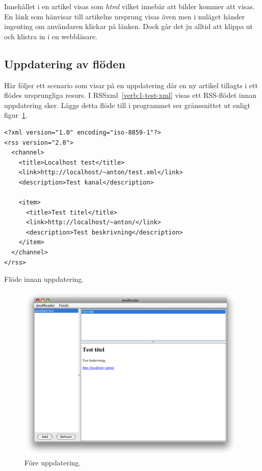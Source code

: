 \documentclass[titlepage, twoside, a4paper, 12pt]{article}
\begin{document}
Innehållet i en artikel visas som \textit{html} vilket innebär att
bilder kommer att visas. En länk som hänvisar till artikelns ursprung
visas även men i nuläget händer ingenting om användaren klickar på
länken. Dock går det ju alltid att klippa ut och klistra in i en
webbläsare.

\subsection{Uppdatering av flöden}
Här följer ett scenario som visar på en uppdatering där en ny artikel
tillagts i ett flödes ursprungliga resurs. I
RSSxml~\ref{verb:1-test-xml} visas ett RSS-flödet innan uppdatering
sker. Läggs detta flöde till i programmet ser gränssnittet ut enligt
figur~\ref{fig:update-test1-out}.

\begin{program}
\begin{footnotesize}
\begin{verbatim}
<?xml version="1.0" encoding="iso-8859-1"?>
<rss version="2.0">
  <channel>
    <title>Localhost test</title>
    <link>http://localhost/~anton/test.xml</link>
    <description>Test kanal</description>

    <item>
      <title>Test titel</title>
      <link>http://localhost/~anton/</link>
      <description>Test beskrivning</description>
    </item>
  </channel>
</rss>
\end{verbatim}
\end{footnotesize}
\caption{Flöde innan uppdatering.}
\label{verb:1-test-xml}
\end{program}

\begin{figure}[!hbp]
  \begin{center}
    \includegraphics[width=110mm]{images/update-test1-out.png}
    \caption{Före uppdatering.}
    \label{fig:update-test1-out}
  \end{center}
\end{figure}
\end{document}
